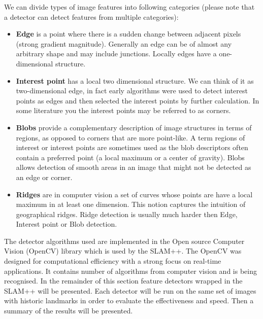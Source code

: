 We can divide types of image features into following categories (please note that a detector can detect features from multiple categories):
\begin{itemize}
	\item \textbf{Edge} is a point where there is a sudden change between adjacent pixels (strong gradient magnitude). Generally an edge can be of almost any arbitrary shape and may include junctions. Locally edges have a one-dimensional structure.
	\item \textbf{Interest point} has a local two dimensional structure. We can think of it as two-dimensional edge, in fact early algorithms were used to detect interest points as edges and then selected the interest points by further calculation. In some literature you the interest points may be referred to as corners.
	\item \textbf{Blobs} provide a complementary description of image structures in terms of regions, as opposed to corners that are more point-like. A term regions of interest or interest points are sometimes used as the blob descriptors often contain a preferred point (a local maximum or a center of gravity). Blobs allows detection of smooth areas in an image that might not be detected as an edge or corner.
	\item \textbf{Ridges} are in computer vision a set of curves whose points are have a local maximum in at least one dimension. This notion captures the intuition of geographical ridges. Ridge detection is usually much harder then Edge, Interest point or Blob detection.
\end{itemize}

The detector algorithms used are implemented in the Open source Computer Vision (OpenCV) \cite{www:opencv} library which is used by the SLAM++. The OpenCV was designed for computational efficiency with a strong focus on real-time applications. It contains number of algorithms from computer vision and is being recognised. In the remainder of this section feature detectors wrapped in the SLAM++ will be presented. Each detector will be run on the same set of images with historic landmarks in order to evaluate the effectiveness and speed. Then a summary of the results will be presented.
 
